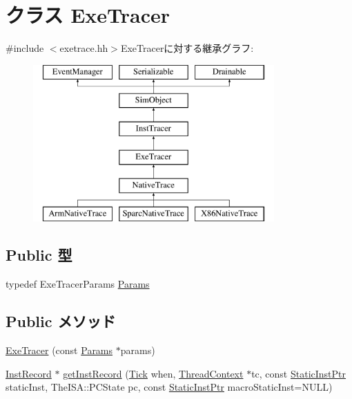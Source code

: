 \hypertarget{classTrace_1_1ExeTracer}{
\section{クラス ExeTracer}
\label{classTrace_1_1ExeTracer}
}


{\ttfamily \#include $<$exetrace.hh$>$}ExeTracerに対する継承グラフ:\begin{figure}[H]
\begin{center}
\leavevmode
\includegraphics[height=6cm]{classTrace_1_1ExeTracer}
\end{center}
\end{figure}
\subsection*{Public 型}
\begin{DoxyCompactItemize}
\item 
typedef ExeTracerParams \hyperlink{classTrace_1_1ExeTracer_a6680098765037131737b022c9fa9252e}{Params}
\end{DoxyCompactItemize}
\subsection*{Public メソッド}
\begin{DoxyCompactItemize}
\item 
\hyperlink{classTrace_1_1ExeTracer_a92497a46d4e8c8ca276bf6c6aecf54a8}{ExeTracer} (const \hyperlink{classTrace_1_1ExeTracer_a6680098765037131737b022c9fa9252e}{Params} $\ast$params)
\item 
\hyperlink{classTrace_1_1InstRecord}{InstRecord} $\ast$ \hyperlink{classTrace_1_1ExeTracer_a89ee504d255c652e5d54b73319d4d3dc}{getInstRecord} (\hyperlink{base_2types_8hh_a5c8ed81b7d238c9083e1037ba6d61643}{Tick} when, \hyperlink{classThreadContext}{ThreadContext} $\ast$tc, const \hyperlink{classRefCountingPtr}{StaticInstPtr} staticInst, TheISA::PCState pc, const \hyperlink{classRefCountingPtr}{StaticInstPtr} macroStaticInst=NULL)
\end{DoxyCompactItemize}


